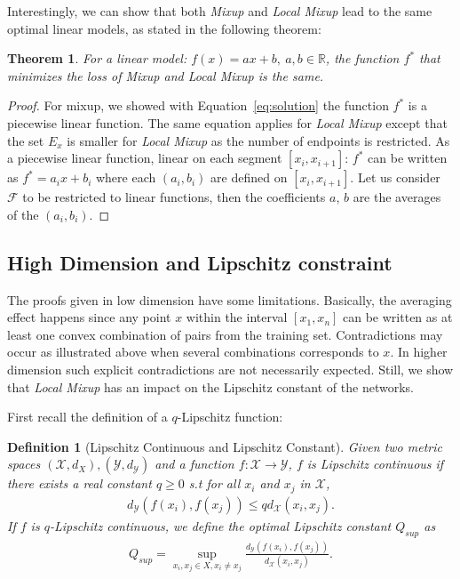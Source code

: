 \documentclass[twoside]{article}
\newtheorem{theorem}{Theorem}[section]
\numberwithin{intassumption}{assumption}
\newtheorem{definition}{Definition}[section]
\begin{document}
Interestingly, we can show that both \emph{Mixup} and \emph{Local Mixup} lead to the same optimal linear models, as stated in the following theorem:

\begin{theorem}
    For a linear model: $f(x) = ax + b, \ a,b \in \mathbb{R}$, the function $f^*$ that minimizes the loss of \emph{Mixup} and \emph{Local Mixup} is the same. 
\end{theorem} 
\begin{proof}
    For mixup, we showed with Equation~\eqref{eq:solution} the function $f^*$ is a piecewise linear function. The same equation applies for \emph{Local Mixup} except that the set $E_x$ is smaller for \emph{Local Mixup} as the number of endpoints is restricted.
    As a piecewise linear function, linear on each segment $[x_i,x_{i+1}]$: $f^*$ can be written as $ f^* = a_i x  + b_i$ where each $(a_i,b_i)$ are defined on $[x_i,x_{i+1}]$.
    Let us consider $\mathcal{F}$ to be restricted to linear functions, then the coefficients $a$, $b$ are the averages of the $(a_i,b_i)$.
\end{proof}

\subsection{High Dimension and Lipschitz constraint}\label{Lipschistsection}
The proofs given in low dimension have some limitations. Basically, the averaging effect happens since any point $x$ within the interval $[x_1,x_n]$ can be written as at least one convex combination of pairs from the training set. Contradictions may occur as illustrated above when several combinations corresponds to $x$. In higher dimension such explicit contradictions are not necessarily expected. Still, we show that \emph{Local Mixup} has an impact on the Lipschitz constant of the networks.

First recall the definition of a $q$-Lipschitz function: 

\begin{definition}[Lipschitz Continuous and Lipschitz Constant]
    Given two metric spaces $(\mathcal{X},d_X), (\mathcal{Y},d_\mathcal{Y})$ and a function $f: \mathcal{X} \to \mathcal{Y}$, $f$ is Lipschitz continuous if there exists a real constant $q \geq 0$ s.t for all $x_i$ and $x_j$ in $\mathcal{X}$, 
    \begin{align}
         d_\mathcal{Y}\left(f(x_i),f(x_j)\right) \leq q d_\mathcal{X}(x_i,x_j).
    \end{align}
     If $f$ is $q$-Lipschitz continuous, we define the optimal Lipschitz constant $Q_{sup}$ as
     \begin{align}
          Q_{sup} = \sup_{x_i,x_j \in X, x_i \neq x_j} \frac{d_\mathcal{Y}\left(f(x_i),f(x_j)\right)}{d_\mathcal{X}(x_i,x_j)}.
     \end{align}
\end{definition}
 
\end{document}
